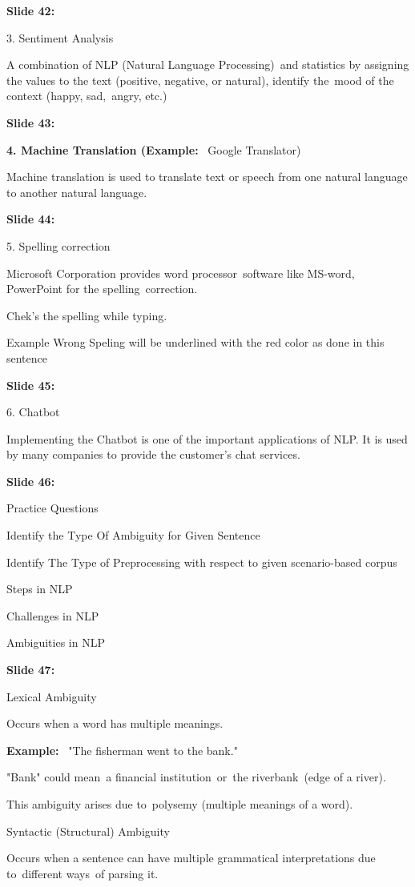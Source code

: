 \documentclass[11pt,a4paper]{article}
\begin{document}
\textbf{Slide 42:}

3. Sentiment Analysis

A combination of NLP (Natural Language Processing) and statistics by assigning the values to the text (positive, negative, or natural), identify the mood of the context (happy, sad, angry, etc.)​

\textbf{Slide 43:}

\textbf{4. Machine Translation (Example:}  Google Translator)

Machine translation is used to translate text or speech from one natural language to another natural language.

\textbf{Slide 44:}

5. Spelling correction

Microsoft Corporation provides word processor software like MS-word, PowerPoint for the spelling correction.

Chek's the spelling while typing.

Example Wrong Speling will be underlined with the red color as done in this sentence

\textbf{Slide 45:}

6. Chatbot

Implementing the Chatbot is one of the important applications of NLP. It is used by many companies to provide the customer's chat services.

\textbf{Slide 46:}

Practice Questions

Identify the Type Of Ambiguity for Given Sentence

Identify The Type of Preprocessing with respect to given scenario-based corpus

Steps in NLP

Challenges in NLP

Ambiguities in NLP

\textbf{Slide 47:}

Lexical Ambiguity

Occurs when a word has multiple meanings.

\textbf{Example:}  "The fisherman went to the bank."

"Bank" could mean a financial institution or the riverbank (edge of a river).

This ambiguity arises due to polysemy (multiple meanings of a word).

Syntactic (Structural) Ambiguity

Occurs when a sentence can have multiple grammatical interpretations due to different ways of parsing it.
\end{document}
